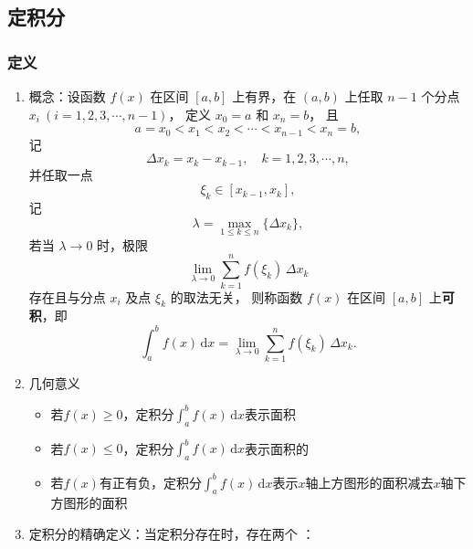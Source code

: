 \documentclass[a4paper,12pt]{article}
\newcommand{\blueuline}[1]{{\color{blue}\uline{\color{black}{#1}}}}
\begin{document}
    \subsection{定积分}

    \subsubsection{定义}

    \begin{enumerate}
        \item 概念：设函数 $f(x)$ 在区间 $[a,b]$ 上有界，在 $(a,b)$ 上任取 $n-1$ 个分点
        $x_i \ (i = 1,2,3,\cdots,n-1)$，
        定义 $x_0 = a$ 和 $x_n = b$，
        且
        \[
            a = x_0 < x_1 < x_2 < \cdots < x_{n-1} < x_n = b,
        \]
        记
        \[
            \Delta x_k = x_k - x_{k-1}, \quad k = 1,2,3,\cdots,n,
        \]
        并任取一点
        \[
            \xi_k \in [x_{k-1}, x_k],
        \]
        记
        \[
            \lambda = \max_{1 \leq k \leq n} \{ \Delta x_k \},
        \]
        若当 $\lambda \to 0$ 时，极限
        \[
            \lim_{\lambda \to 0} \sum_{k=1}^{n} f(\xi_k)\,\Delta x_k
        \]
        存在且与分点 $x_i$ 及点 $\xi_k$ 的取法无关，
        则称函数 $f(x)$ 在区间 $[a,b]$ 上\textbf{可积}，即
        \[
            \int_a^b f(x)\,\mathrm{d}x
            =
            \lim_{\lambda \to 0} \sum_{k=1}^{n} f(\xi_k)\,\Delta x_k.
        \]
        \item 几何意义
        \begin{itemize}
            \item 若$f(x) \geq 0$，定积分$\int_a^b f(x)\,\mathrm{d}x$表示面积
            \item 若$f(x) \leq 0$，定积分$\int_a^b f(x)\,\mathrm{d}x$表示面积的{\color{red}{负值}}
            \item 若$f(x)$有正有负，定积分$\int_a^b f(x)\,\mathrm{d}x$表示$x$轴上方图形的面积减去$x$轴下方图形的面积
        \end{itemize}
        \item 定积分的精确定义：当定积分存在时，存在两个 {\blueuline{任取}}：

\end{enumerate}
\end{document}

